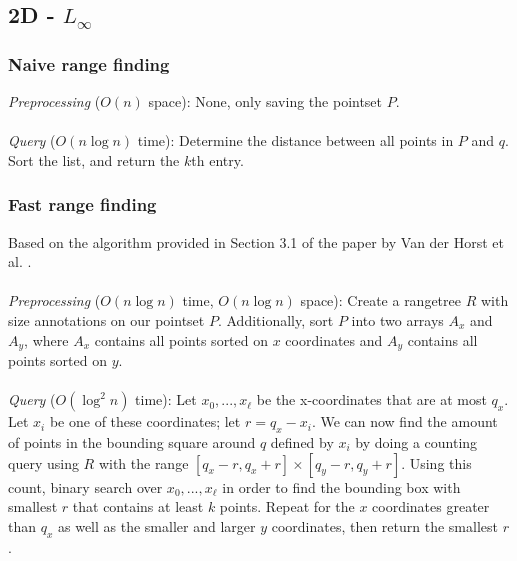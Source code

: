 \documentclass{article}
\newcommand{\fb}[1]{{#1}}
\newcommand{\fbnote}[1]{{}}
\begin{document}
\subsection{2D - $L_\infty$}
\subsubsection{Naive range finding}
\fbnote{I made a mistake here (as well as in the naive mode) by using a definition of $L_{\infty}$ that uses a \textit{minimum} instead of a \textit{maximum}. I don't really know how this happened. For the mode, I now made the naive case simply do a range tree query + color counting. For range finding on the other hand, I couldn't figure something out in time that was simpler than the algorithm already proposed while still having a decent (and ideally $k$ dependent) runtime. I therefore opted to use the most naive of all approaches by simply sorting all distances. I am aware that this is not an ideal baseline, however given the time this is the best I could still do. }
\fb{
\textit{Preprocessing} ($O(n)$ space): None, only saving the pointset $P$. \\\\
\textit{Query} ($O(n \log n)$ time): Determine the distance between all points in $P$ and $q$. Sort the list, and return the $k$th entry.
}
\subsubsection{Fast range finding}
Based on the algorithm provided in Section 3.1 of the paper by Van der Horst et
al. \cite{vanderhorst_et_al:LIPIcs.ESA.2022.67}.\\\\ 
\textit{Preprocessing} ($O(n \log n)$ time, $O(n \log n)$ space): Create a rangetree $R$ \fb{with size annotations} on our pointset $P$. Additionally, sort $P$ into two
arrays $A_x$ and $A_y$, where $A_x$ contains all points sorted on $x$
coordinates and $A_y$ contains all points sorted on $y$. \\\\ 
\textit{Query} ($O(\log^2 n)$ time):
Let $x_0, ..., x_\ell$ be the x-coordinates that are at most $q_x$. Let $x_i$
be one of these coordinates; let $r = q_x - x_i$. We can now find the amount of
points in the bounding square around $q$ defined by $x_i$ by doing a counting
query using $R$ with the range $[q_x - r, q_x + r] \times [q_y - r, q_y + r]$.
Using this count, binary search over $x_0, ..., x_\ell$ in order to find the
bounding box with smallest $r$ that contains at least $k$ points. Repeat for
the $x$ coordinates greater than $q_x$ as well as the smaller and larger $y$
coordinates, then return the smallest $r$.
\end{document}
